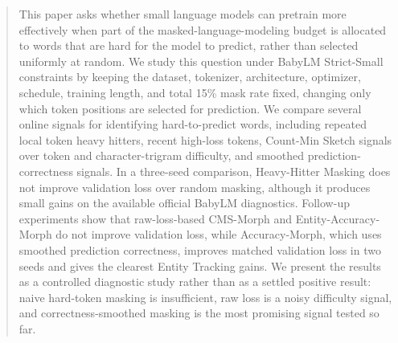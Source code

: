 \begin{abstract}
This paper asks whether small language models can pretrain more effectively when part of the masked-language-modeling budget is allocated to words that are hard for the model to predict, rather than selected uniformly at random. We study this question under BabyLM Strict-Small constraints by keeping the dataset, tokenizer, architecture, optimizer, schedule, training length, and total 15\% mask rate fixed, changing only which token positions are selected for prediction. We compare several online signals for identifying hard-to-predict words, including repeated local token heavy hitters, recent high-loss tokens, Count-Min Sketch signals over token and character-trigram difficulty, and smoothed prediction-correctness signals. In a three-seed comparison, Heavy-Hitter Masking does not improve validation loss over random masking, although it produces small gains on the available official BabyLM diagnostics. Follow-up experiments show that raw-loss-based CMS-Morph and Entity-Accuracy-Morph do not improve validation loss, while Accuracy-Morph, which uses smoothed prediction correctness, improves matched validation loss in two seeds and gives the clearest Entity Tracking gains. We present the results as a controlled diagnostic study rather than as a settled positive result: naive hard-token masking is insufficient, raw loss is a noisy difficulty signal, and correctness-smoothed masking is the most promising signal tested so far.
\end{abstract}
